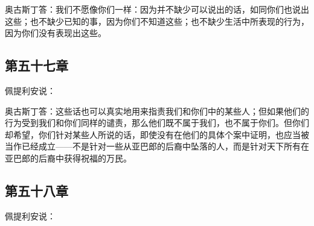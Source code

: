 奥古斯丁答：我们不愿像你们一样：因为并不缺少可以说出的话，如同你们也说出这些；也不缺少已知的事，因为你们不知道这些；也不缺少生活中所表现的行为，因为你们没有表现出这些。\par


\subsection{第五十七章}

佩提利安说：\par

奥古斯丁答：这些话也可以真实地用来指责我们和你们中的某些人；但如果他们的行为受到我们和你们同样的谴责，那么他们既不属于我们，也不属于你们。但你们却希望，你们针对某些人所说的话，即使没有在他们的具体个案中证明，也应当被当作已经成立——不是针对一些从亚巴郎的后裔中坠落的人，而是针对天下所有在亚巴郎的后裔中获得祝福的万民。\par


\subsection{第五十八章}

佩提利安说：\par

